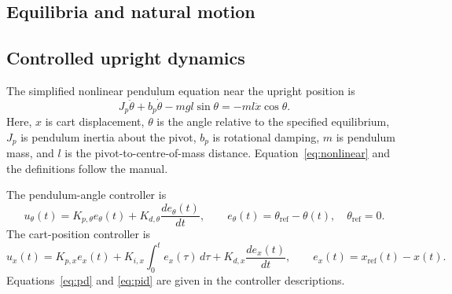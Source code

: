 \documentclass[11pt,a4paper]{article}
\newif\ifdraft
\DeclareRobustCommand{\guide}[1]{\ifdraft\par\smallskip\small\itshape Draft guidance: #1\par\smallskip\fi}
\newcommand{\manual}[1]{\cite[printed pp.~#1]{labmanual}}
\begin{document}
\subsection{Equilibria and natural motion}
\guide{Explain natural stability at SP1 and natural instability at SP2. Introduce inertia, restoring action, and energy dissipation; connect these concepts to the later observations. Sources: Introduction and SP1 theory, \manual{2, 6--7}.}

\subsection{Controlled upright dynamics}
The simplified nonlinear pendulum equation near the upright position is
\begin{equation}
 J_p\ddot{\theta}+b_p\dot{\theta}-mgl\sin\theta
 =-ml\ddot{x}\cos\theta.
 \label{eq:nonlinear}
\end{equation}
Here, $x$ is cart displacement, $\theta$ is the angle relative to the specified equilibrium, $J_p$ is pendulum inertia about the pivot, $b_p$ is rotational damping, $m$ is pendulum mass, and $l$ is the pivot-to-centre-of-mass distance. Equation~\eqref{eq:nonlinear} and the definitions follow the manual. \manual{4--5, 7, 15}

The pendulum-angle controller is
\begin{equation}
 u_\theta(t)=K_{p,\theta}e_\theta(t)
 +K_{d,\theta}\frac{de_\theta(t)}{dt},
 \qquad e_\theta(t)=\theta_{\mathrm{ref}}-\theta(t),
 \quad \theta_{\mathrm{ref}}=0.
 \label{eq:pd}
\end{equation}
The cart-position controller is
\begin{equation}
 u_x(t)=K_{p,x}e_x(t)+K_{i,x}\int_0^t e_x(\tau)\,d\tau
 +K_{d,x}\frac{de_x(t)}{dt},
 \qquad e_x(t)=x_{\mathrm{ref}}(t)-x(t).
 \label{eq:pid}
\end{equation}
Equations~\eqref{eq:pd} and \eqref{eq:pid} are given in the controller descriptions. \manual{7--8}
\guide{Explain the proportional and derivative terms, slower cart regulation, and dead-zone compensation. Preserve the gain signs. The manual relates the negative proportional gain to coordinate and motor conventions; do not reinterpret it without supporting information. The controller is active only within $|\theta|\leq20^\circ$ and there is no automatic swing-up. Sources: \manual{7--8}.}
\end{document}
